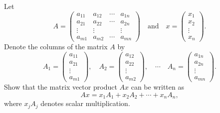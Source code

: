 \documentclass{ximera}
\begin{document}
\begin{exercise} \label{c4.1.b3}
Let
\[
A=\left(
\begin{array}{rrrr}
 a_{11} & a_{12} & \cdots & a_{1n} \\
 a_{21} & a_{22} & \cdots & a_{2n}  \\
 \vdots & \vdots &        & \vdots  \\
 a_{m1} & a_{m2} & \cdots & a_{mn}
\end{array}
\right)\quad\mbox{and}\quad
x =
\left( \begin{array}{r} x_1\\ x_2\\ \vdots\\ x_n\end{array}\right).
\]
Denote the columns of the matrix $A$ by
\[
A_1 =
\left(\begin{array}{c} a_{11}\\ a_{21}\\ \vdots\\
a_{m1}\end{array}\right),\quad
A_2 =
\left(\begin{array}{c} a_{12}\\ a_{22}\\ \vdots\\
a_{m2}\end{array}\right),\quad
\cdots\quad
A_n =
\left(\begin{array}{c} a_{1n}\\ a_{2n}\\ \vdots\\ a_{mn}\end{array}\right).
\]
Show that the matrix vector product $Ax$ can be written as
\[
Ax = x_1 A_1 + x_2 A_2 + \cdots + x_n A_n,
\]
where $x_j A_j$ denotes scalar multiplication. %

\begin{solution}


\end{solution}
\end{exercise}
\end{document}
